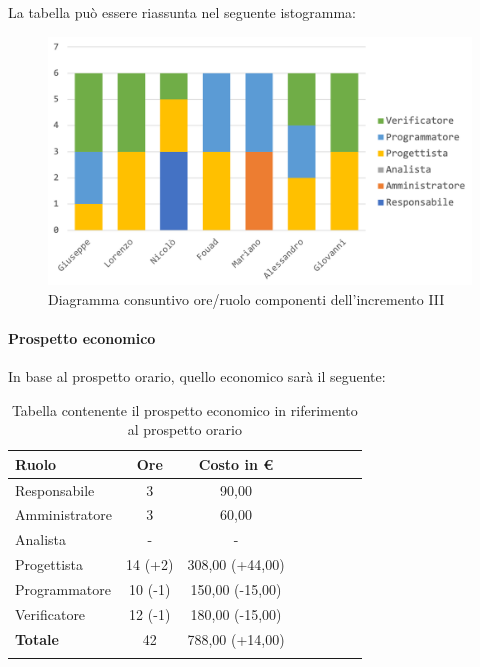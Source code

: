 			La tabella può essere riassunta nel seguente istogramma:
			
			\begin{figure}[H]
				\centering
				\includegraphics[width=0.8\linewidth]{images/consuntivo/ConsIncr3-1.png}
				\caption{Diagramma consuntivo ore/ruolo componenti dell'incremento III}
				\label{fig:consuntivo diagramma suddivione ruoli incremento III}
			\end{figure}
			
		\paragraph{Prospetto economico}
			In base al prospetto orario, quello economico sarà il seguente: 
			
			\begin{longtable}{|l|c|c|c|c|c|c|c|}
				\hline
				\rowcolor{lighter-grayer}
				\textbf{Ruolo} & \textbf{Ore} & \textbf{Costo in €} \\
				\hline
				\endfirsthead
				\hline
				Responsabile 	    & 3 & 90,00 \\
				\hline 
				\hline
				Amministratore	  & 3 & 60,00\\
				\hline
				\hline
				Analista 				& - & -\\
				\hline
				\hline
				Progettista 		  & 14 (+2) & 308,00 (+44,00)\\
				\hline
				\hline
				Programmatore 	 & 10 (-1) & 150,00 (-15,00) \\
				\hline
				\hline
				Verificatore 		  & 12 (-1) & 180,00 (-15,00)\\
				\hline
				\textbf{Totale} 	& 42 & 788,00 (+14,00)\\
				\hline 
					
				\caption{Tabella contenente il prospetto economico in riferimento al prospetto orario}
			\end{longtable}
		\pagebreak
			
